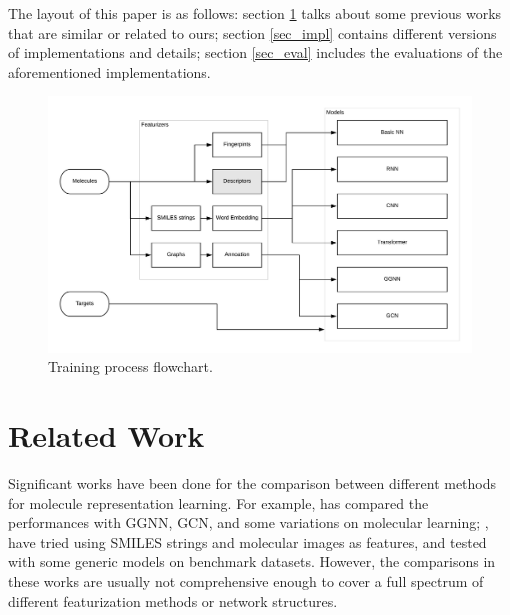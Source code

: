 \documentclass[conference]{IEEEtran}
\begin{document}
The layout of this paper is as follows: 
section \ref{sec_rw} talks about some previous works that are similar or related to ours; 
section \ref{sec_impl} contains different versions of implementations and details; 
section \ref{sec_eval} includes the evaluations of the aforementioned implementations. 

\begin{figure}[!htb] 
	\includegraphics[width=\linewidth]{train.png}
	\caption{\small Training process flowchart. }
	\label{fig:train}
\end{figure}

\section{Related Work} \label{sec_rw}

Significant works have been done for the comparison between different methods for molecule representation learning. 
For example, \cite{gagcn} has compared the performances with GGNN, GCN, and some variations on molecular learning; \cite{smiles2vec}, \cite{chemception} have tried using SMILES strings and molecular images as features, and tested with some generic models on benchmark datasets. 
However, the comparisons in these works are usually not comprehensive enough to cover a full spectrum of different featurization methods or network structures. 
\end{document}
